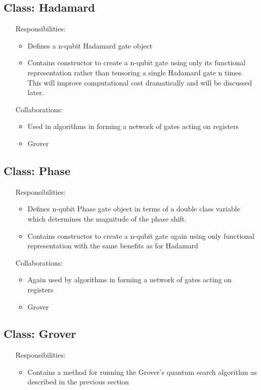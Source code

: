 \documentclass[12pt]{report}
\begin{document}
\subsection{Class: Hadamard}
\label{sec:Hadamard}
\begin{itemize}
	\item [Responsibilities:]
	\begin{itemize}
		\item Defines a n-qubit Hadamard gate object
		\item Contains constructor to create a n-qubit gate using only its functional representation rather than tensoring a single Hadamard gate n times.  This will improve computational cost dramatically and will be discussed later.
	\end{itemize}
	\item [Collaborations:]
		\begin{itemize}
		\item Used in algorithms in forming a network of gates acting on registers
		\item Grover
	\end{itemize}
\end{itemize}
\subsection{Class: Phase}
\label{sec:Phase}
\begin{itemize}
	\item [Responsibilities:]
	\begin{itemize}
		\item Defines n-qubit Phase gate object in terms of a double class variable which determines the magnitude of the phase shift.
		\item Contains constructor to create a n-qubit gate again using only functional representation with the same benefits as for Hadamard
	\end{itemize}
	\item [Collaborations:]
		\begin{itemize}
		\item Again used by algorithms in forming a network of gates acting on registers
		\item Grover
	\end{itemize}
\end{itemize}
\subsection{Class: Grover}
\label{sec:Grover}
\begin{itemize}
	\item [Responsibilities:]
	\begin{itemize}
		\item Contains a method for running the Grover's quantum search algorithm as described in the previous section
	\end{itemize}
\end{itemize}
\end{document}
